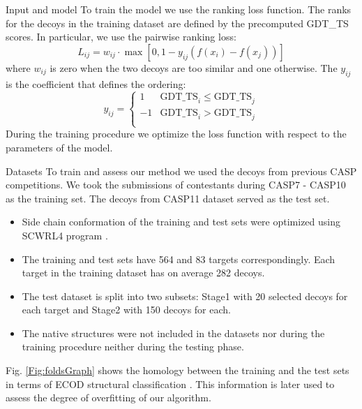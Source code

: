 \documentclass[final, unknownkeysallowed]{beamer}
\begin{document}
\begin{frame}{}
\begin{textblock}{39.0}
\begin{block}{Input and model}
To train the model we use the ranking loss function. 
The ranks for the decoys in the training dataset are defined by the precomputed GDT\_TS scores.
In particular, we use the pairwise ranking loss:
$$ L_{ij} = w_{ij} \cdot \max \left[ 0, 1 - y_{ij} \left( f \left( x_i \right) - f \left( x_j \right) \right) \right] $$
where $w_{ij}$ is zero when the two decoys are too similar and one otherwise. 
The $y_{ij}$ is the coefficient that defines the ordering:
$$
y_{ij} = \begin{cases}
               1& \textrm{GDT\_TS}_i \leq \textrm{GDT\_TS}_j \\
               -1& \textrm{GDT\_TS}_i > \textrm{GDT\_TS}_j \\
            \end{cases}
$$
During the training procedure we optimize the loss function with respect to the parameters of the model.

\end{block}

\begin{block}{Datasets}
   To train and assess our method we used the decoys from previous CASP competitions. 
We took the submissions of contestants during CASP7 - CASP10 as the training set.
The decoys from CASP11 dataset served as the test set.
\begin{itemize}
\item Side chain conformation of the training and test sets were optimized using SCWRL4 program \cite{krivov2009improved}.
\item The training and test sets have 564 and 83 targets correspondingly. Each target in the training dataset has on average 282 decoys.
\item The test dataset is split into two subsets: Stage1 with 20 selected decoys for each target and Stage2 with 150 decoys
for each.
\item The native structures were not included in the datasets nor during the training procedure neither during the testing phase. 
\end{itemize}

Fig. \ref{Fig:foldsGraph} shows the homology between the training and the test sets in terms of 
ECOD structural classification \cite{cheng2014ecod}. 
This information is later used to assess the degree of overfitting of our algorithm.


\end{block}
\end{textblock}
\end{frame}
\end{document}
